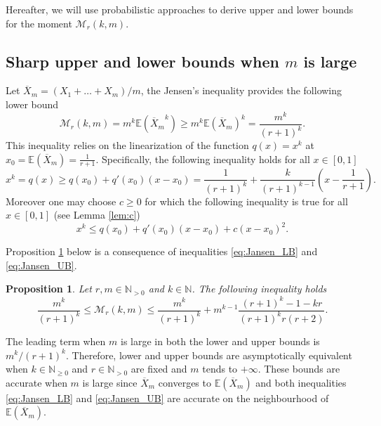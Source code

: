 \documentclass{article}
\theoremstyle{plain}
\newtheorem{proposition}[theorem]{Proposition}
\newcommand{\N}{{\mathbb N}}
\newcommand{\E}{{\mathbb E}}
\newcommand{\V}{{\mathcal M}}
\begin{document}
Hereafter, we will use probabilistic approaches to derive upper and lower bounds for the moment $\V_r(k,m)$. 
 \subsection{Sharp upper and lower bounds when $m$ is large}
 Let $\overline{X}_m=(X_1+\dots+X_m)/m$, the Jensen's inequality provides the following lower bound 
 \begin{equation}\label{lower}
 \V_r(k,m)=m^k \E\left({\overline{X}_m}^k\right) \ge m^k \E\left({\overline{X}_m}\right)^k =\frac{m^k}{(r+1)^k}.
 \end{equation}
 This inequality relies on the linearization of the function $q(x)=x^k$ at $x_0=\E(\overline{X}_m)=\frac{1}{r+1}$. Specifically, the following inequality holds for all $x\in [0,1]$
\begin{equation}
\label{eq:Jansen_LB}
 x^k=q(x)\ge q(x_0) + q'(x_0)(x-x_0) = \frac{1}{(r+1)^k}+\frac{k}{(r+1)^{k-1}}\left(x-\frac{1}{r+1}\right).
\end{equation}
Moreover one may choose $c \ge 0$ for which the following inequality is true for all $x\in [0,1]$ (see Lemma \ref{lem:c})
\begin{equation}
\label{eq:Jansen_UB}
 x^k\le q(x_0) + q'(x_0)(x-x_0) + c (x-x_0)^2.
\end{equation}


Proposition \ref{prop:bounds_Jansen} below is a consequence of inequalities \eqref{eq:Jansen_LB} and \eqref{eq:Jansen_UB}. 

\begin{proposition}
\label{prop:bounds_Jansen}
Let $r,m\in \N_{>0}$ and $k\in \N$. The following inequality holds
 \begin{equation}
  \frac{m^k}{(r+1)^k}\le \V_r(k,m) \le %
  \frac{m^k}{(r+1)^k} + m^{k-1}\frac{(r + 1)^k - 1 - k r}{(r + 1)^k r (r+2)}.
 \end{equation}
\end{proposition}

The leading term when $m$ is large in both the lower and upper bounds is $m^k/(r+1)^k$. Therefore, lower and upper bounds are asymptotically equivalent when $k\in \N_{\ge 0}$ and $r\in \N_{>0}$ are fixed and 
$m$ tends to $+\infty$. These bounds are accurate
when $m$ is large since $\overline{X}_m$ converges to $\E(\overline{X}_m)$ and both inequalities \eqref{eq:Jansen_LB} and  \eqref{eq:Jansen_UB}
are accurate on the neighbourhood of $\E(\overline{X}_m)$. 
\end{document}
